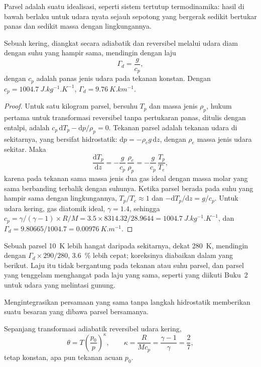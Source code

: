 Parsel adalah suatu idealisasi, seperti sistem tertutup termodinamika: hasil di bawah berlaku untuk udara nyata sejauh sepotong yang bergerak sedikit bertukar panas dan sedikit massa dengan lingkungannya.

\begin{theorem}\label{thm:b1:fluid-envelopes-structure:dry-adiabatic}
Sebuah  kering, diangkat secara adiabatik dan reversibel melalui udara diam dengan suhu yang hampir sama, mendingin dengan laju
\[
  \Gamma_d = \frac{g}{c_p},
\]
dengan $c_p$ adalah panas jenis udara pada tekanan konstan. Dengan $c_p =
\qty{1004.7}{J.kg^{-1}.K^{-1}}$, $\Gamma_d = \qty{9.76}{K.km^{-1}}$.
\end{theorem}

\begin{proof}
Untuk satu kilogram parsel, bersuhu $T_p$ dan massa jenis $\rho_p$, hukum pertama untuk transformasi reversibel tanpa pertukaran panas, ditulis dengan entalpi, adalah $c_p\,\mathrm dT_p - \mathrm dp/\rho_p = 0$. Tekanan parsel adalah tekanan udara di sekitarnya, yang bersifat hidrostatik: $\mathrm dp = -\rho_e
g\,\mathrm dz$, dengan $\rho_e$ massa jenis udara sekitar. Maka
\[
  \frac{\mathrm dT_p}{\mathrm dz} = -\frac{g}{c_p}\,\frac{\rho_e}{\rho_p}
  = -\frac{g}{c_p}\,\frac{T_p}{T_e},
\]
karena pada tekanan sama massa jenis dua gas ideal dengan massa molar yang sama berbanding terbalik dengan suhunya. Ketika parsel berada pada suhu yang hampir sama dengan lingkungannya, $T_p/T_e \approx 1$ dan $-\mathrm dT_p/\mathrm dz
= g/c_p$. Untuk udara kering, gas diatomik ideal, $\gamma = 1.4$, sehingga $c_p =
\gamma/(\gamma - 1) \times R/M = 3.5 \times 8314.32/28.9644 =
\qty{1004.7}{J.kg^{-1}.K^{-1}}$, dan $\Gamma_d = 9.80665/1004.7 =
\qty{0.00976}{K.m^{-1}}$.
\end{proof}

Sebuah parsel \qty{10}{K} lebih hangat daripada sekitarnya, dekat \qty{280}{K}, mendingin dengan $\Gamma_d \times 290/280$, \qty{3.6}{\percent} lebih cepat; koreksinya diabaikan dalam yang berikut. Laju itu tidak bergantung pada tekanan atau suhu parsel, dan parsel yang tenggelam menghangat pada laju yang sama, seperti yang diikuti Buku~2 untuk udara yang melintasi gunung.

Mengintegrasikan persamaan yang sama tanpa langkah hidrostatik memberikan suatu besaran yang dibawa parsel bersamanya.

\begin{proposition}\label{prop:b1:fluid-envelopes-structure:theta}
Sepanjang transformasi adiabatik reversibel udara kering,
\[
  \theta = T\left(\frac{p_0}{p}\right)^{\kappa},\qquad \kappa = \frac{R}{Mc_p} =
  \frac{\gamma - 1}{\gamma} = \frac{2}{7},
\]
tetap konstan, apa pun tekanan acuan $p_0$.
\end{proposition}

